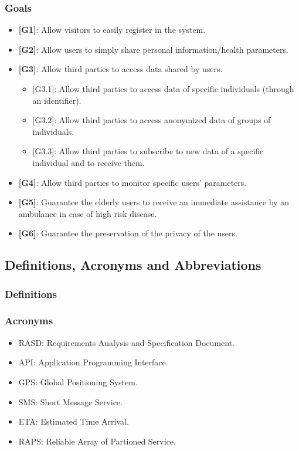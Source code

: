 \documentclass[12pt,a4paper]{article}
\begin{document}
			\subsubsection{Goals}
		\begin{itemize}
			\item {\textbf[}\textbf{G1}{\textbf]}: Allow visitors to easily register in the system.
			\item {\textbf[}\textbf{G2}{\textbf]}: Allow users to simply share personal information/health parameters.
			\item {\textbf[}\textbf{G3}{\textbf]}: Allow third parties to access data shared by users.
			\begin{itemize}
				\item {[G3.1]}: Allow third parties to access data of specific individuals (through an identifier).
				\item {[G3.2]}: Allow third parties to access anonymized data of groups of individuals.
				\item {[G3.3]}: Allow third parties to subscribe to new data of a specific individual and to receive them.
			\end{itemize}
			\item {\textbf[}\textbf{G4}{\textbf]}: Allow third parties to monitor specific users' parameters.
			\item {\textbf[}\textbf{G5}{\textbf]}: Guarantee the elderly users to receive an immediate assistance by an ambulance in case of high risk disease.
			\item {\textbf[}\textbf{G6}{\textbf]}: Guarantee the preservation of the privacy of the users.
		\end{itemize}
	
	
		\subsection{Definitions, Acronyms and Abbreviations}
			\subsubsection{Definitions}
			\subsubsection{Acronyms}
				\begin{itemize}
				\item RASD: Requirements Analysis and Specification Document.
				\item API: Application Programming Interface.
				\item GPS: Global Positioning System.
				\item SMS: Short Message Service. 
				\item ETA: Estimated Time Arrival.
				\item RAPS: Reliable Array of Partioned Service.
				\end{itemize}
\end{document}
